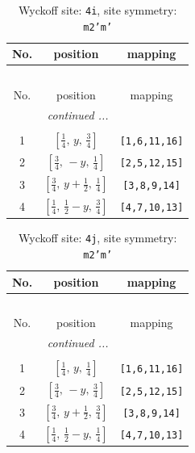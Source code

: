 \documentclass[fleqn,8pt]{jsarticle}
\begin{document}
\renewcommand{\arraystretch}{1.2}
\begin{longtable}{ccc}
\caption{Wyckoff site: {\tt 4i}, site symmetry: {\tt m2'm'}}
 \\
 \hline \hline
No. & position & mapping \\ \hline \endfirsthead

\multicolumn{2}{l}{\tablename\ \thetable{}} \\
 \hline \hline
No. & position & mapping \\ \hline \endhead

 \hline \hline
\multicolumn{2}{r}{\footnotesize\it continued ...} \\ \endfoot

 \hline \hline
\multicolumn{2}{r}{} \\ \endlastfoot

1 & $\left[ \frac{1}{4},\, y,\, \frac{3}{4} \right]$ & {\tt [1,6,11,16]} \\ \hline
2 & $\left[ \frac{3}{4},\, - y,\, \frac{1}{4} \right]$ & {\tt [2,5,12,15]} \\ \hline
3 & $\left[ \frac{3}{4},\, y + \frac{1}{2},\, \frac{1}{4} \right]$ & {\tt [3,8,9,14]} \\ \hline
4 & $\left[ \frac{1}{4},\, \frac{1}{2} - y,\, \frac{3}{4} \right]$ & {\tt [4,7,10,13]} \\
\end{longtable}
\renewcommand{\arraystretch}{1.2}
\begin{longtable}{ccc}
\caption{Wyckoff site: {\tt 4j}, site symmetry: {\tt m2'm'}}
 \\
 \hline \hline
No. & position & mapping \\ \hline \endfirsthead

\multicolumn{2}{l}{\tablename\ \thetable{}} \\
 \hline \hline
No. & position & mapping \\ \hline \endhead

 \hline \hline
\multicolumn{2}{r}{\footnotesize\it continued ...} \\ \endfoot

 \hline \hline
\multicolumn{2}{r}{} \\ \endlastfoot

1 & $\left[ \frac{1}{4},\, y,\, \frac{1}{4} \right]$ & {\tt [1,6,11,16]} \\ \hline
2 & $\left[ \frac{3}{4},\, - y,\, \frac{3}{4} \right]$ & {\tt [2,5,12,15]} \\ \hline
3 & $\left[ \frac{3}{4},\, y + \frac{1}{2},\, \frac{3}{4} \right]$ & {\tt [3,8,9,14]} \\ \hline
4 & $\left[ \frac{1}{4},\, \frac{1}{2} - y,\, \frac{1}{4} \right]$ & {\tt [4,7,10,13]} \\
\end{longtable}
\end{document}
